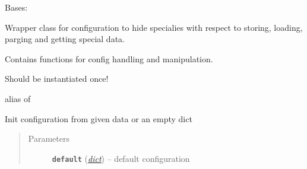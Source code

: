 \documentclass[letterpaper,10pt,english]{sphinxmanual}
\begin{document}

\begin{fulllineitems}
\label{util/misc:escape.util.misc.ESCAPEConfig}
Bases: \href{https://docs.python.org/2.7/library/functions.html\#object}{}

Wrapper class for configuration to hide specialies with respect to storing,
loading, parging and getting special data.

Contains functions for config handling and manipulation.

Should be instantiated once!

\begin{fulllineitems}
\label{util/misc:escape.util.misc.ESCAPEConfig.__metaclass__}
alias of {\hyperref[util/misc:escape.util.misc.Singleton]{\emph{}}}

\end{fulllineitems}


\begin{fulllineitems}
\label{util/misc:escape.util.misc.ESCAPEConfig.LAYERS}
\end{fulllineitems}


\begin{fulllineitems}
\label{util/misc:escape.util.misc.ESCAPEConfig.__init__}
Init configuration from given data or an empty dict
\begin{quote}\begin{description}
\item[{Parameters}] \leavevmode
\textbf{\texttt{default}} (\href{https://docs.python.org/2.7/library/stdtypes.html\#dict}{\emph{dict}}) -- default configuration

\end{description}\end{quote}

\end{fulllineitems}


\end{fulllineitems}
\end{document}
